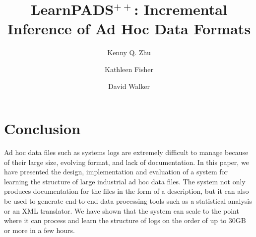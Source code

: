 \documentclass{llncs}
\begin{document}
%
\title{{\sc LearnPADS}$^{++}$: Incremental Inference of Ad Hoc Data Formats}
\author{Kenny Q. Zhu \and Kathleen Fisher \and 
David Walker} 

\maketitle





%









\section{Conclusion}
\label{sec:conclude}
Ad hoc data files such as systems logs 
are extremely difficult to manage because of their large size,
evolving format, and lack of documentation.
In this paper, we have presented the design, implementation and
evaluation of a system for learning the structure of 
large industrial ad hoc data files.  The system not only
produces documentation for the files in the form of a \pads{}
description, but it can also be used to generate end-to-end
data processing tools such as a statistical analysis or an
XML translator.  We have shown that the system
can scale to the point where it can process and learn the
structure of logs on the order of up to 30GB or more in 
a few hours.



\end{document}
